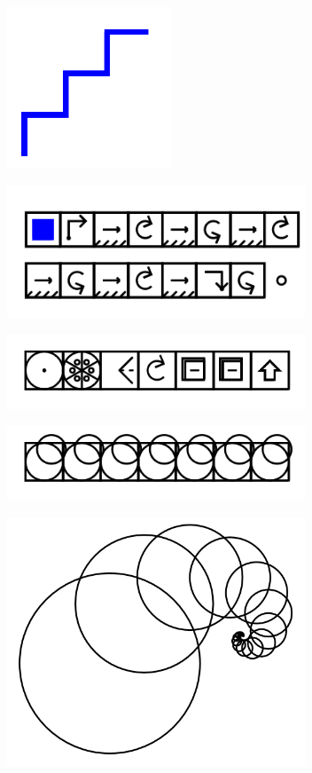 \documentclass[11pt]{article}
\begin{document}
\includegraphics{image35.png}

\includegraphics[width=3.5in]{image36.png}

\includegraphics[width=3.5in]{image37.png}

\includegraphics[width=3.5in]{image38.png}

\includegraphics[width=3.5in]{image39.png}
\end{document}
